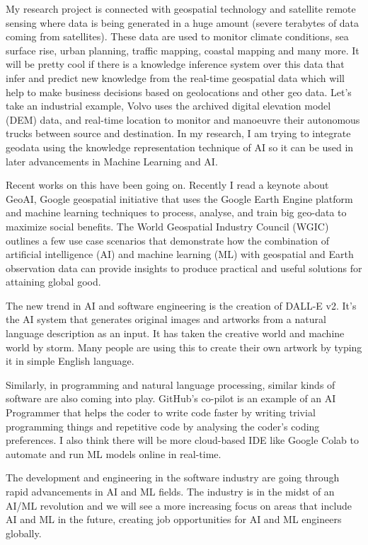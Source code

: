 \documentclass[10.9pt]{article}
\begin{document}
My research project is connected with geospatial technology and satellite remote sensing where data is being generated in a huge amount (severe terabytes of data coming from satellites). These data are used to monitor climate conditions, sea surface rise, urban planning, traffic mapping, coastal mapping and many more. It will be pretty cool if there is a knowledge inference system over this data that infer and predict new knowledge from the real-time geospatial data which will help to make business decisions based on geolocations and other geo data. Let’s take an industrial example, Volvo uses the archived digital elevation model (DEM) data, and real-time location to monitor and manoeuvre their autonomous trucks between source and destination. In my research, I am trying to integrate geodata using the knowledge representation technique of AI so it can be used in later advancements in Machine Learning and AI.

Recent works on this have been going on. Recently I read a keynote about GeoAI, Google geospatial initiative that uses the Google Earth Engine platform and machine learning techniques to process, analyse, and train big geo-data to maximize social benefits. The World Geospatial Industry Council (WGIC) outlines a few use case scenarios that demonstrate how the combination of artificial intelligence (AI) and machine learning (ML) with geospatial and Earth observation data can provide insights to produce practical and useful solutions for attaining global good.

The new trend in AI and software engineering is the creation of DALL-E v2. It’s the AI system that generates original images and artworks from a natural language description as an input. It has taken the creative world and machine world by storm. Many people are using this to create their own artwork by typing it in simple English language. 

Similarly, in programming and natural language processing, similar kinds of software are also coming into play. GitHub’s co-pilot is an example of an AI Programmer that helps the coder to write code faster by writing trivial programming things and repetitive code by analysing the coder’s coding preferences. I also think there will be more cloud-based IDE like Google Colab to automate and run ML models online in real-time. 

The development and engineering in the software industry are going through rapid advancements in AI and ML fields. The industry is in the midst of an AI/ML revolution and we will see a more increasing focus on areas that include AI and ML in the future, creating job opportunities for AI and ML engineers globally. 
\end{document}
